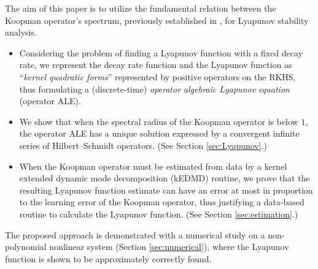 \documentclass[english]{cccconf}
\renewcommand{\emph}[1]{\textit{#1}}
\begin{document}
\par The aim of this paper is to utilize the fundamental relation between the Koopman operator's spectrum, previously established in \cite{tang-ye-2025-l4dc}, for Lyapunov stability analysis. 
\begin{itemize}
    \item Considering the problem of finding a Lyapunov function with a fixed decay rate, we represent the decay rate function and the Lyapunov function as ``\emph{kernel quadratic forms}'' represented by positive operators on the RKHS, thus formulating a (discrete-time) \emph{operator algebraic Lyapunov equation} (operator ALE). 
    \item We show that when the spectral radius of the Koopman operator is below $1$, the operator ALE has a unique solution expressed by a convergent infinite series of Hilbert--Schmidt operators. (See Section \ref{sec:Lyapunov}.)
    \item When the Koopman operator must be estimated from data by a kernel extended dynamic mode decomposition (kEDMD) routine, we prove that the resulting Lyapunov function estimate can have an error at most in proportion to the learning error of the Koopman operator, thus justifying a data-based routine to calculate the Lyapunov function. (See Section \ref{sec:estimation}.)
\end{itemize}
The proposed approach is demonstrated with a numerical study on a non-polynomial nonlinear system (Section \ref{sec:numerical}), where the Lyapunov function is shown to be approximately correctly found. %
\end{document}
